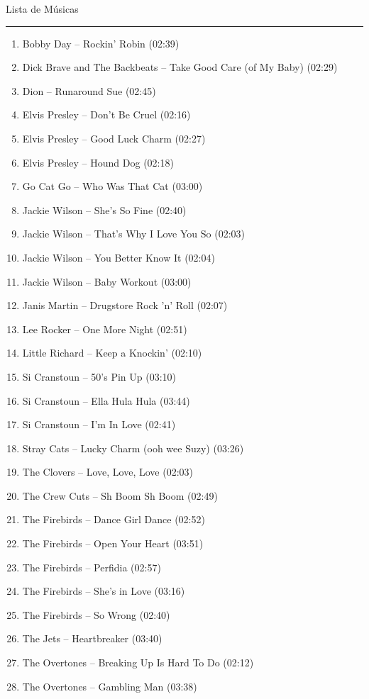 \documentclass{article}
\begin{document}
\begin{minipage}[t][0.95\textheight][t]{0.5\textwidth}
    \centering
    \vspace{0.1cm}
    {\Large Lista de Músicas}\\
    \rule{\textwidth}{1pt}
    \scriptsize
    \begin{enumerate}
        \setlength\itemsep{1mm}
        \item Bobby Day -- Rockin' Robin (02:39)
        \item Dick Brave and The Backbeats -- Take Good Care (of My Baby) (02:29)
        \item Dion -- Runaround Sue (02:45)
        \item Elvis Presley -- Don't Be Cruel (02:16)
        \item Elvis Presley -- Good Luck Charm (02:27)
        \item Elvis Presley -- Hound Dog (02:18)
        \item Go Cat Go -- Who Was That Cat (03:00)
        \item Jackie Wilson -- She's So Fine (02:40)
        \item Jackie Wilson -- That's Why I Love You So (02:03)
        \item Jackie Wilson -- You Better Know It (02:04)
        \item Jackie Wilson -- Baby Workout (03:00)
        \item Janis Martin -- Drugstore Rock 'n' Roll (02:07)
        \item Lee Rocker -- One More Night (02:51)
        \item Little Richard -- Keep a Knockin' (02:10)
        \item Si Cranstoun -- 50's Pin Up (03:10)
        \item Si Cranstoun -- Ella Hula Hula (03:44)
        \item Si Cranstoun -- I'm In Love (02:41)
        \item Stray Cats -- Lucky Charm (ooh wee Suzy) (03:26)
        \item The Clovers -- Love, Love, Love (02:03)
        \item The Crew Cuts -- Sh Boom Sh Boom (02:49)
        \item The Firebirds -- Dance Girl Dance (02:52)
        \item The Firebirds -- Open Your Heart (03:51)
        \item The Firebirds -- Perfidia (02:57)
        \item The Firebirds -- She's in Love (03:16)
        \item The Firebirds -- So Wrong (02:40)
        \item The Jets -- Heartbreaker (03:40)
        \item The Overtones -- Breaking Up Is Hard To Do (02:12)
        \item The Overtones -- Gambling Man (03:38)
    \end{enumerate}
\end{minipage}
\end{document}
